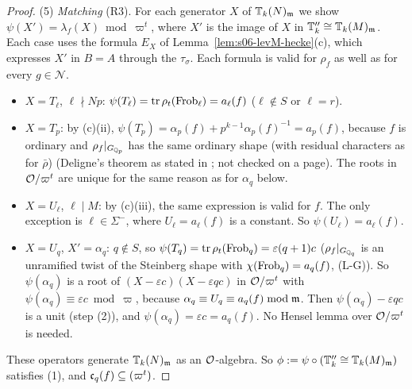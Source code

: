\begin{proof}
(5) \emph{Matching} (R3). For each generator $X$ of $\mathbb{T}_k(N)_{\mathfrak{m}}$ we show $\psi(X')=\lambda_f(X)\bmod\varpi^t$, where $X'$ is the image
of $X$ in $\mathbb{T}''_k\cong\mathbb{T}_k(M)_{\mathfrak{m}}$. Each case uses the formula $E_X$ of Lemma~\ref{lem:s06-levM-hecke}(c), which expresses $X'$ in $B=A$
through the $\tau_\sigma$. Each formula is valid for $\rho_f$ as well as for every $g\in\mathcal N$.
\begin{itemize}
\item $X=T_\ell$, $\ell\nmid Np$: $\psi(T_\ell)=\operatorname{tr}\rho_t(\mathrm{Frob}_\ell)=a_\ell(f)$ ($\ell\notin S$ or $\ell=r$).
\item $X=T_p$: by (c)(ii), $\psi(T_p)=\alpha_p(f)+p^{k-1}\alpha_p(f)^{-1}=a_p(f)$, because $f$ is ordinary and $\rho_f|_{G_{\mathbb{Q}_p}}$ has the
  same ordinary shape (with residual characters as for $\bar\rho$) (Deligne's theorem as stated in \cite[Thm~2.5]{Edi92}; not checked on a
  page). The roots in $\mathcal{O}/\varpi^t$ are unique for the same reason as for
  $\alpha_q$ below.
\item $X=U_\ell$, $\ell\mid M$: by (c)(iii), the same expression is valid for $f$. The only exception is $\ell\in\Sigma^-$, where $U_\ell=a_\ell(f)$ is
  a constant. So $\psi(U_\ell)=a_\ell(f)$.
\item $X=U_q$, $X'=\alpha_q$: $q\notin S$, so $\psi(T_q)=\operatorname{tr}\rho_t(\mathrm{Frob}_q)=\varepsilon(q+1)c$ ($\rho_f|_{G_{\mathbb{Q}_q}}$ is an unramified twist of
  the Steinberg shape with $\chi(\mathrm{Frob}_q)=a_q(f)$, (L-G)). So $\psi(\alpha_q)$ is a root of $(X-\varepsilon c)(X-\varepsilon qc)$ in $\mathcal{O}/\varpi^t$
  with $\psi(\alpha_q)\equiv\varepsilon c\bmod\varpi$, because $\alpha_q\equiv U_q\equiv a_q(f)\bmod\mathfrak{m}$. Then $\psi(\alpha_q)-\varepsilon qc$ is a unit
  (step (2)), and $\psi(\alpha_q)=\varepsilon c=a_q(f)$. No Hensel lemma over $\mathcal{O}/\varpi^t$ is needed.
\end{itemize}
These operators generate $\mathbb{T}_k(N)_{\mathfrak{m}}$ as an $\mathcal{O}$-algebra. So $\phi:=\psi\circ(\mathbb{T}''_k\cong\mathbb{T}_k(M)_{\mathfrak{m}})$ satisfies (1), and
$\mathfrak{c}_q(f)\subseteq(\varpi^t)$.
\end{proof}

